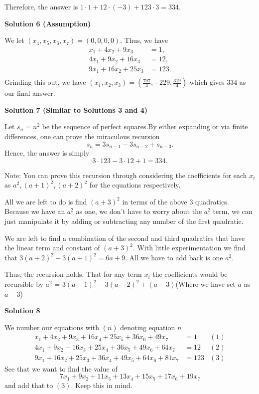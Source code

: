\begin{enumerate}
 Therefore, the answer is $1\cdot1+12\cdot(-3) + 123\cdot3 = \boxed{334}.$




\textbf{Solution 6 (Assumption)}

We let $(x_4,x_5,x_6,x_7)=(0,0,0,0)$. Thus, we have 
 \begin{align*}  x_1+4x_2+9x_3&=1,\\ 4x_1+9x_2+16x_3&=12,\\ 9x_1+16x_2+25x_3&=123.\\  \end{align*}
Grinding this out, we have $(x_1,x_2,x_3)=\left(\frac{797}{4},-229,\frac{319}{4}\right)$ which gives $\boxed{334}$ as our final answer. 

 



\textbf{Solution 7 (Similar to Solutions 3 and 4)}

Let $s_n = n^2$ be the sequence of perfect squares.By either expanding or via finite differences, one can prove the miraculous recursion
 \[s_n = 3s_{n-1} - 3s_{n-2} + s_{n-3}.\]Hence, the answer is simply
 \[3 \cdot 123 - 3 \cdot 12 + 1 = \boxed{334}.\]

 Note: You can prove this recursion through considering the coefficients for each $x_i$ as $a^2, (a+1)^2, (a+2)^2$ for the equations respectively.

 All we are left to do is find $(a+3)^2$ in terms of the above $3$ quadratics. Because we have an $a^2$ as one, we don't have to worry about the $a^2$ term, we can just manipulate it by adding or subtracting any number of the first quadratic.

 We are left to find a combination of the second and third quadratics that have the linear term and constant of $(a+3)^2$. With little experimentation we find that $3(a+2)^2 - 3(a+1)^2 = 6a+9$. All we have to add back is one $a^2$.

 Thus, the recursion holds. That for any term $x_i$ the coefficients would be recursible by $a^2$ = $3(a-1)^2 - 3(a-2)^2 + (a-3)$(Where we have set $a$ as $a-3$)

 



\textbf{Solution 8}

We number our equations with $(n)$ denoting equation $n$
 \begin{align*} x_1 + 4x_2 + 9x_3 + 16x_4 + 25x_5 + 36x_6 + 49x_7 &= 1  &(1)\\ 4x_1 + 9x_2 + 16x_3 + 25x_4 + 36x_5 + 49x_6 + 64x_7 &= 12  &(2) \\ 9x_1 + 16x_2 + 25x_3 + 36x_4 + 49x_5 + 64x_6 + 81x_7 &= 123   &(3) \end{align*}
See that we want to find the value of 
 \[7x_{1}+9x_{2}+11x_{3}+13x_{4}+15x_{5}+17x_{6}+19x_{7}\] and add that to $(3)$. Keep this in mind. 


\end{enumerate}
